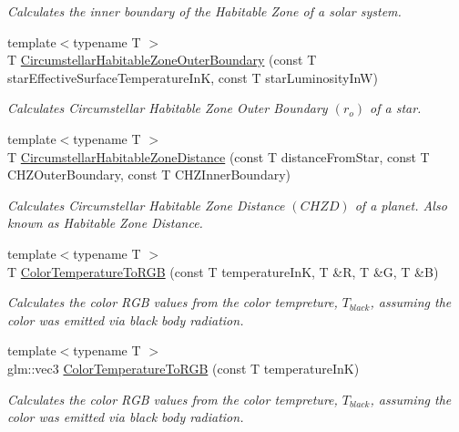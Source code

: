 \begin{DoxyCompactItemize}
\begin{DoxyCompactList}\small\item\em Calculates the inner boundary of the Habitable Zone of a solar system. \end{DoxyCompactList}\item 
{\footnotesize template$<$typename T $>$ }\\T \mbox{\hyperlink{group___e_g_x_phys-_circumstellar_habitable_zone_limit_ga3a6dbbdaddddd071cb1f0a20e40d83bd}{Circumstellar\+Habitable\+Zone\+Outer\+Boundary}} (const T star\+Effective\+Surface\+Temperature\+InK, const T star\+Luminosity\+InW)
\begin{DoxyCompactList}\small\item\em Calculates Circumstellar Habitable Zone Outer Boundary $(r_o)$ of a star. \end{DoxyCompactList}\item 
{\footnotesize template$<$typename T $>$ }\\T \mbox{\hyperlink{group___e_g_x_phys-_circumstellar_habitable_zone_limit_ga3247e5fe14db39121ce622207af172fd}{Circumstellar\+Habitable\+Zone\+Distance}} (const T distance\+From\+Star, const T C\+H\+Z\+Outer\+Boundary, const T C\+H\+Z\+Inner\+Boundary)
\begin{DoxyCompactList}\small\item\em Calculates Circumstellar Habitable Zone Distance $(CHZD)$ of a planet. Also known as Habitable Zone Distance. \end{DoxyCompactList}\item 
{\footnotesize template$<$typename T $>$ }\\T \mbox{\hyperlink{group___e_g_x_phys-_astrophysics-_color_temperature_ga81db6b5b397c9f788001be73adae032d}{Color\+Temperature\+To\+R\+GB}} (const T temperature\+InK, T \&R, T \&G, T \&B)
\begin{DoxyCompactList}\small\item\em Calculates the color R\+GB values from the color tempreture, $T_{black}$, assuming the color was emitted via black body radiation. \end{DoxyCompactList}\item 
{\footnotesize template$<$typename T $>$ }\\glm\+::vec3 \mbox{\hyperlink{group___e_g_x_phys-_astrophysics-_color_temperature_gaad787485a232976da96c2c785ce21dad}{Color\+Temperature\+To\+R\+GB}} (const T temperature\+InK)
\begin{DoxyCompactList}\small\item\em Calculates the color R\+GB values from the color tempreture, $T_{black}$, assuming the color was emitted via black body radiation. \end{DoxyCompactList}\item 

\end{DoxyCompactItemize}
